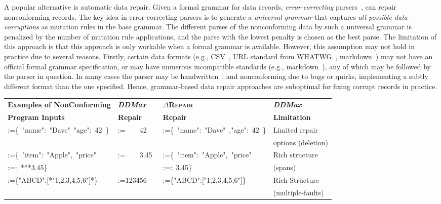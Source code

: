 \documentclass[acmsmall,screen,review,anonymous]{acmart}
\makeatletter
\newcommand{\dtask}{data repair\xspace}
\newcommand{\approach}{\textsc{$\Delta$Repair}\xspace}
\newcommand{\ddmax}{\textit{DDMax}\xspace}
\newcommand\letterboxedinTable[1]{%
\setlength{\fboxsep}{0pt}%
  \@tfor\@ii:=#1\do{%
    \fcolorbox{white}{light-gray}{\tiny \texttt{\strut\@ii}}%
  }%
}
\makeatother
\begin{document}
A popular alternative is automatic \dtask.
Given a formal grammar for data records,
\emph{error-correcting} parsers~\cite{aho1972minimum,diekmann2020dont,parr2011ll}, can
repair nonconforming records.
The key idea in error-correcting parsers is to generate a \emph{universal grammar}
that captures \emph{all possible data-corruptions} as mutation rules
in the base grammar.
The different parses of the nonconforming data by such a universal grammar is
penalized by the number of mutation rule applications, and the parse with the
lowest penalty is chosen as the best parse.
The limitation of this approach is that this approach is only workable when
a formal grammar is available.
However,
this assumption may not hold in practice due to several reasons.
Firstly,
certain data formats (e.g., CSV~\cite{taocp},
URL standard from WHATWG~\cite{whatwgurl,urldisagree}, markdown~\cite{gruber2004markdown})
may not have an official formal grammar specification, or may
have numerous incompatible standards
(e.g., markdown~\cite{gruber2004markdown}), any of which may be followed by the
parser in question. In many cases the parser may be handwritten~\cite{uncommongrammars,uncommongrammars2}, and nonconforming due to bugs or quirks,
implementing a subtly different format than the one specified.
Hence, grammar-based \dtask approaches
are suboptimal for fixing corrupt records in practice.

\begin{table*}\centering

\caption{\ddmax vs. \approach: examples showing limitations of \ddmax and the strengths of \approach}
{%
\begin{tabular}{|l | l | l | l |}
\hline
\textbf{Examples of NonConforming}& \textbf{\ddmax} & \textbf{\approach} & \textbf{\ddmax} \\
\textbf{Program Inputs} & \textbf{Repair} & \textbf{Repair} & \textbf{Limitation} \\
\hline
\letterboxedinTable{\{\ "name":\ "Dave"\ "age":\ 42\ \}} &
\letterboxedinTable{\ \ \ \ 42\ }  &
\letterboxedinTable{\{\ "name":\ "Dave"\ ,"age":\ 42\ \}} &
Limited repair \\
& & & options (deletion) \\
\hline
\letterboxedinTable{\{\ "item":\ "Apple",\ "price"} & \letterboxedinTable{\ \ \ \
3.45\ } & \letterboxedinTable{\{\ "item":\ "Apple",\ "price"} & Rich structure
\\
\letterboxedinTable{:\ ***3.45\}} & &\letterboxedinTable{:\ 3.45\}} &  (spans) \\
\hline
\letterboxedinTable{\{"ABCD":[*"1,2,3,4,5,6"]*\}} &
\letterboxedinTable{123456} &
\letterboxedinTable{\{"ABCD":["1,2,3,4,5,6"]\}} &
Rich Structure\\

& & &  (multiple-faults)  \\
\hline
\end{tabular}}
\label{tab:ddmaxlimitations}
\end{table*}
\end{document}
